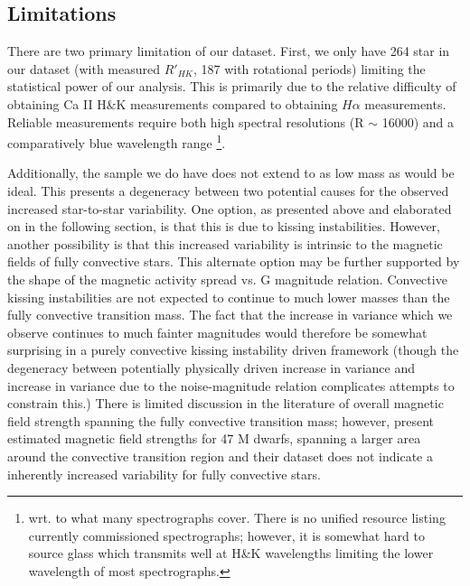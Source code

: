 \subsection{Limitations}
There are two primary limitation of our dataset. First, we only have 264 star
in our dataset (with measured $R'_{HK}$, 187 with rotational periods) limiting
the statistical power of our analysis. This is primarily due to the relative
difficulty of obtaining Ca II H\&K measurements compared to obtaining $H\alpha$
measurements. Reliable measurements require both high spectral resolutions (R
$\sim$ 16000) and a comparatively blue wavelength range \footnote{wrt. to what
many spectrographs cover. There is no unified resource listing currently
commissioned spectrographs; however, it is somewhat hard to source glass which
transmits well at H\&K wavelengths limiting the lower wavelength of most
spectrographs.}.

Additionally, the sample we do have does not extend to as low mass as would be
ideal. This presents a degeneracy between two potential causes for the observed
increased star-to-star variability. One option, as presented above and
elaborated on in the following section, is that this is due to kissing
instabilities. However, another possibility is that this increased variability
is intrinsic to the magnetic fields of fully convective stars. This alternate
option may be further supported by the shape of the magnetic activity spread vs.
G magnitude relation. Convective kissing instabilities are not expected to
continue to much lower masses than the fully convective transition mass. The
fact that the increase in variance which we observe continues to much fainter
magnitudes would therefore be somewhat surprising in a purely convective kissing
instability driven framework (though the degeneracy between potentially
physically driven increase in variance and increase in variance due to the
noise-magnitude relation complicates attempts to constrain this.) There is
limited discussion in the literature of overall magnetic field strength
spanning the fully convective transition mass; however, \citet{Shulyak2019}
present estimated magnetic field strengths for 47 M dwarfs, spanning a larger
area around the convective transition region and their dataset does not
indicate a inherently increased variability for fully convective stars.
